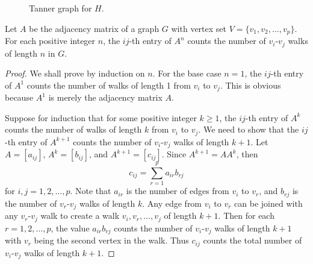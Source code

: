\begin{figure}[!htbp]
\centering
{}
\caption{Tanner graph for $H$.}
\label{fig:introduction:tanner_graph}
\end{figure}

\begin{theorem}
Let $A$ be the adjacency matrix of a graph $G$ with vertex set
$V = \{v_1, v_2, \dots, v_p\}$. For each positive integer $n$, the
$ij$-th entry of $A^n$ counts the number of $v_i$-$v_j$ walks of
length $n$ in $G$.
\end{theorem}

\begin{proof}
We shall prove by induction on $n$. For the base case $n = 1$, the
$ij$-th entry of $A^1$ counts the number of walks of length 1 from
$v_i$ to $v_j$. This is obvious because $A^1$ is merely the adjacency
matrix $A$.

Suppose for induction that for some positive integer $k \geq 1$, the
$ij$-th entry of $A^k$ counts the number of walks of length $k$ from
$v_i$ to $v_j$. We need to show that the $ij$-th entry of $A^{k+1}$
counts the number of $v_i$-$v_j$ walks of length $k + 1$. Let
$A = [a_{ij}]$, $A^k = [b_{ij}]$, and $A^{k+1} = [c_{ij}]$. Since
$A^{k+1} = A A^k$, then
\[
c_{ij}
=
\sum_{r=1}^p a_{ir} b_{rj}
\]
for $i,j = 1, 2, \dots, p$. Note that $a_{ir}$ is the number of edges
from $v_i$ to $v_r$, and $b_{rj}$ is the number of $v_r$-$v_j$ walks
of length $k$. Any edge from $v_i$ to $v_r$ can be joined with any
$v_r$-$v_j$ walk to create a walk $v_i, v_r, \dots, v_j$ of length
$k + 1$. Then for each $r = 1, 2, \dots, p$, the value $a_{ir} b_{rj}$
counts the number of $v_i$-$v_j$ walks of length $k + 1$ with $v_r$
being the second vertex in the walk. Thus $c_{ij}$ counts the total
number of $v_i$-$v_j$ walks of length $k + 1$.
\end{proof}



